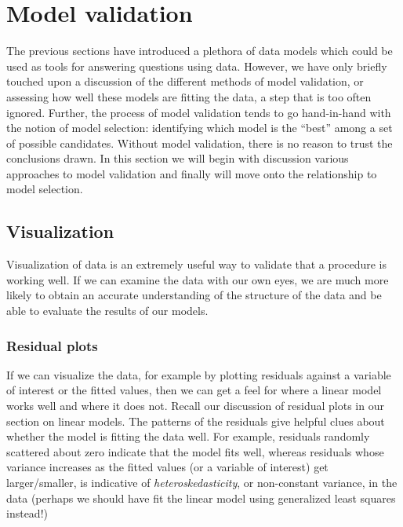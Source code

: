 \chapter{Model validation}
\label{ch:valid}


The previous sections have introduced a plethora of data models which could be used as tools for answering questions using data. However, we have only briefly touched upon a discussion of the different methods of model validation, or assessing how well these models are fitting the data, a step that is too often ignored. Further, the process of model validation tends to go hand-in-hand with the notion of model selection: identifying which model is the ``best'' among a set of possible candidates. Without model validation, there is no reason to trust the conclusions drawn. In this section we will begin with discussion various approaches to model validation and finally will move onto the relationship to model selection.



\section{Visualization}

Visualization of data is an extremely useful way to validate that a procedure is working well. If we can examine the data with our own eyes, we are much more likely to obtain an accurate understanding of the structure of the data and be able to evaluate the results of our models.

\subsection*{Residual plots}

If we can visualize the data, for example by plotting residuals against a variable of interest or the fitted values, then we can get a feel for where a linear model works well and where it does not. Recall our discussion of residual plots in our section on linear models. The patterns of the residuals give helpful clues about whether the model is fitting the data well. For example, residuals randomly scattered about zero indicate that the model fits well, whereas residuals whose variance increases as the fitted values (or a variable of interest) get larger/smaller, is indicative of \textit{heteroskedasticity}, or non-constant variance, in the data (perhaps we should have fit the linear model using generalized least squares instead!)



